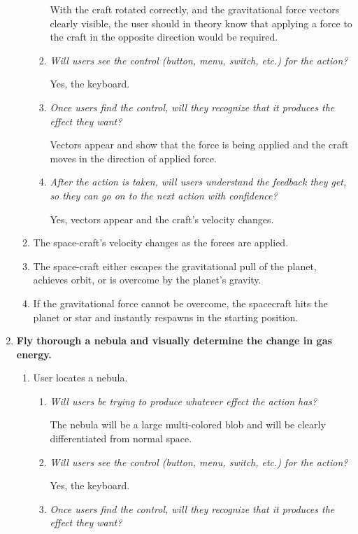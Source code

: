 \begin{enumerate}
\begin{enumerate}
\begin{enumerate}
    With the craft rotated correctly, and the gravitational force vectors clearly visible, the user should in theory know that applying a force to the craft in the opposite direction would be required.
    \item \emph{Will users see the control (button, menu, switch, etc.) for the action?}

    Yes, the keyboard.
    \item \emph{Once users find the control, will they recognize that it produces the effect they want?}

    Vectors appear and show that the force is being applied and the craft moves in the direction of applied force.
    \item \emph{After the action is taken, will users understand the feedback they get, so they can go on to the next action with confidence?}

    Yes, vectors appear and the craft's velocity changes.
  \end{enumerate}

  \item The space-craft's velocity changes as the forces are applied.

  \item The space-craft either escapes the gravitational pull of the planet, achieves orbit, or is overcome by the planet's gravity.

  \item If the gravitational force cannot be overcome, the spacecraft hits the planet or star and instantly respawns in the starting position.

\end{enumerate}

\item\textbf{Fly thorough a nebula and visually determine the change in gas energy.}
\begin{enumerate}

  \item User locates a nebula.
  \begin{enumerate}
    \item \emph{Will users be trying to produce whatever effect the action has?}
	  
    The nebula will be a large multi-colored blob and will be clearly differentiated from normal space.
    \item \emph{Will users see the control (button, menu, switch, etc.) for the action?}

    Yes, the keyboard.
    \item \emph{Once users find the control, will they recognize that it produces the effect they want?}


\end{enumerate}
\end{enumerate}
\end{enumerate}
